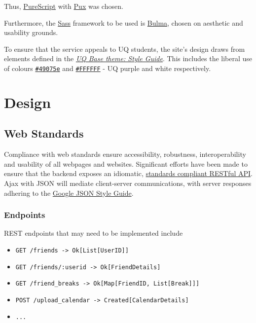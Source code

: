 \documentclass[11pt,a4paper]{report}
\begin{document}
Thus, \href{http://www.purescript.org/}{PureScript} with \href{http://www.purescript-pux.org/}{Pux} was chosen.

Furthermore, the \href{https://sass-lang.com/}{Sass} framework to be used is \href{http://bulma.io/}{Bulma}, chosen on aesthetic and usability grounds.

To ensure that the service appeals to UQ students, the site's design draws from elements defined in the \href{http://drupal.uq.edu.au/guide/uq-base-theme-style-guide}{\textit{UQ Base theme: Style Guide}}. This includes the liberal use of colours \href{http://www.color-hex.com/color/49075e}{\texttt{\#49075e}} and \href{http://www.color-hex.com/color/ffffff}{\texttt{\#FFFFFF}} - UQ purple and white respectively.


\chapter{Design}

\section{Web Standards}

Compliance with web standards ensure accessibility, robustness, interoperability and usability of all webpages and websites. Significant efforts have been made to ensure that the backend exposes an idiomatic, \href{https://http2.github.io/}{standards compliant RESTful API}. Ajax with JSON will mediate client-server communications, with server responses adhering to the \href{https://google.github.io/styleguide/jsoncstyleguide.xml}{Google JSON Style Guide}.

\subsection{Endpoints}

REST endpoints that may need to be implemented include

\begin{itemize}
    \item \texttt{GET /friends -> Ok[List[UserID]]}
    \item \texttt{GET /friends/:userid -> Ok[FriendDetails]}
    \item \texttt{GET /friend\_breaks -> Ok[Map[FriendID, List[Break]]]}
    \item \texttt{POST /upload\_calendar -> Created[CalendarDetails]}
    \item \texttt{...}
\end{itemize}
\end{document}
